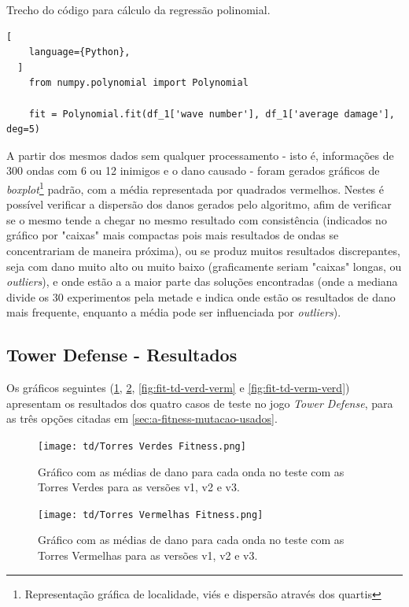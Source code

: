 \begin{programruledcaption}{Trecho do código para cálculo da regressão polinomial.\label{prog:polyfit}}
  \begin{lstlisting}[
    language={Python},
  ]
    from numpy.polynomial import Polynomial
    
    fit = Polynomial.fit(df_1['wave number'], df_1['average damage'], deg=5)
  \end{lstlisting}
\end{programruledcaption}

A partir dos mesmos dados sem qualquer processamento - isto é, informações de 300 ondas com 6 ou 12 inimigos e o dano causado - foram gerados gráficos de \textit{boxplot}\footnote{Representação gráfica de localidade, viés e dispersão através dos quartis} padrão, com a média representada por quadrados vermelhos. Nestes é possível verificar a dispersão dos danos gerados pelo algoritmo, afim de verificar se o mesmo tende a chegar no mesmo resultado com consistência (indicados no gráfico por "caixas" mais compactas pois mais resultados de ondas se concentrariam de maneira próxima), ou se produz muitos resultados discrepantes, seja com dano muito alto ou muito baixo (graficamente seriam "caixas" longas, ou \textit{outliers}), e onde estão a a maior parte das soluções encontradas (onde a mediana divide os 30 experimentos pela metade e indica onde estão os resultados de dano mais frequente, enquanto a média pode ser influenciada por \textit{outliers}).

\subsection{Tower Defense - Resultados}
\label{sec:td-fit-res}

Os gráficos seguintes (\ref{fig:fit-td-verde}, \ref{fig:fit-td-verm}, \ref{fig:fit-td-verd-verm} e \ref{fig:fit-td-verm-verd}) apresentam os resultados dos quatro casos de teste no jogo \textit{Tower Defense}, para as três opções citadas em \ref{sec:a-fitness-mutacao-usados}.

\begin{figure}[H]
  \centering
  \texttt{[image: td/Torres Verdes Fitness.png]}
  \caption{Gráfico com as médias de dano para cada onda no teste com as Torres Verdes para as versões v1, v2 e v3.}
  \label{fig:fit-td-verde}
\end{figure}

\begin{figure}[H]
  \centering
  \texttt{[image: td/Torres Vermelhas Fitness.png]}
  \caption{Gráfico com as médias de dano para cada onda no teste com as Torres Vermelhas para as versões v1, v2 e v3.}
  \label{fig:fit-td-verm}
\end{figure}

